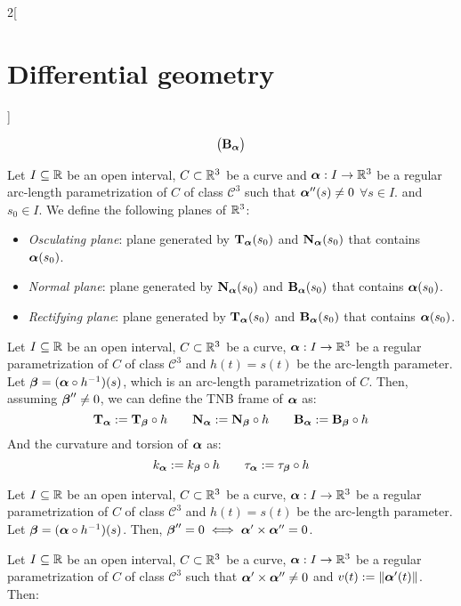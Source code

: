 \documentclass[../../../main.tex]{subfiles}
\begin{document}
\begin{multicols}{2}[\section{Differential geometry}]
\begin{theorem}
$$\begin{pmatrix}
        \B\alpha \\
      \end{pmatrix}
    $$
  \end{theorem}
  \begin{definition}
    Let $I\subseteq\RR$ be an open interval, $C\subset\RR^3$ be a curve and $\vf{\alpha}:I\rightarrow\RR^3$ be a regular arc-length parametrization of $C$ of class $\mathcal{C}^3$ such that $\vf{\alpha}''(s)\ne 0$ $\forall s\in I$. and $s_0\in I$. We define the following planes of $\RR^3$:
    \begin{itemize}
      \item \emph{Osculating plane}: plane generated by $\T\alpha(s_0)$ and $\N\alpha(s_0)$ that contains $\vf{\alpha}(s_0)$.
      \item \emph{Normal plane}: plane generated by $\N\alpha(s_0)$ and $\B\alpha(s_0)$ that contains $\vf{\alpha}(s_0)$.
      \item \emph{Rectifying plane}: plane generated by $\T\alpha(s_0)$ and $\B\alpha(s_0)$ that contains $\vf{\alpha}(s_0)$.
    \end{itemize}
  \end{definition}
  \begin{proposition}
    Let $I\subseteq\RR$ be an open interval, $C\subset\RR^3$ be a curve, $\vf{\alpha}:I\rightarrow\RR^3$ be a regular parametrization of $C$ of class $\mathcal{C}^3$ and $h(t)=s(t)$ be the arc-length parameter. Let $\vf{\beta}=(\vf{\alpha}\circ h^{-1})(s)$, which is an arc-length parametrization of $C$. Then, assuming $\vf{\beta}''\ne 0$, we can define the TNB frame of $\vf{\alpha}$ as: $$\T\alpha:=\T\beta\circ h\qquad\N\alpha:=\N\beta\circ h\qquad\B\alpha:=\B\beta\circ h$$
    And the curvature and torsion of $\vf\alpha$ as: $$k_{\vf\alpha}:=k_{\vf\beta}\circ h\qquad\ta\alpha:=\ta\beta\circ h$$
  \end{proposition}
  \begin{lemma}
    Let $I\subseteq\RR$ be an open interval, $C\subset\RR^3$ be a curve, $\vf{\alpha}:I\rightarrow\RR^3$ be a regular parametrization of $C$ of class $\mathcal{C}^3$ and $h(t)=s(t)$ be the arc-length parameter. Let $\vf{\beta}=(\vf{\alpha}\circ h^{-1})(s)$. Then, $\vf{\beta}''=0\iff\vf\alpha'\times\vf\alpha''=0$.
  \end{lemma}
  \begin{lemma}
    Let $I\subseteq\RR$ be an open interval, $C\subset\RR^3$ be a curve, $\vf{\alpha}:I\rightarrow\RR^3$ be a regular parametrization of $C$ of class $\mathcal{C}^3$ such that $\vf{\alpha}'\times \vf{\alpha}''\ne 0$ and $v(t):=\|\vf{\alpha}'(t)\|$. Then:

\end{lemma}
\end{multicols}
\end{document}
